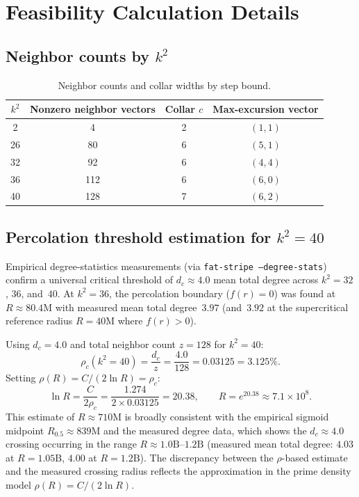 \documentclass[11pt,a4paper]{article}
\newcommand{\fr}{f(r)}
\newcommand{\Rhalf}{R_{0.5}}
\theoremstyle{definition}
\theoremstyle{plain}
\theoremstyle{remark}
\begin{document}
\section{Feasibility Calculation Details}\label{app:feasibility}

\subsection{Neighbor counts by \texorpdfstring{$k^2$}{k\texttwosuperior}}

\begin{table}[ht]
\centering
\begin{tabular}{@{}cccc@{}}
\toprule
$k^2$ & Nonzero neighbor vectors & Collar $c$ & Max-excursion vector \\
\midrule
2  & 4   & 2 & $(1, 1)$ \\
26 & 80  & 6 & $(5, 1)$ \\
32 & 92  & 6 & $(4, 4)$ \\
36 & 112 & 6 & $(6, 0)$ \\
40 & 128 & 7 & $(6, 2)$ \\
\bottomrule
\end{tabular}
\caption{Neighbor counts and collar widths by step bound.}
\label{tab:neighbor-counts}
\end{table}

\subsection{Percolation threshold estimation for \texorpdfstring{$k^2 = 40$}{k\texttwosuperior\ = 40}}

Empirical degree-statistics measurements (via \texttt{fat-stripe --degree-stats}) confirm a universal critical threshold of $d_c \approx 4.0$ mean total degree across $k^2 = 32$, $36$, and~$40$.  At $k^2 = 36$, the percolation boundary ($\fr = 0$) was found at $R \approx 80.4\text{M}$ with measured mean total degree~$3.97$ (and~$3.92$ at the supercritical reference radius $R = 40\text{M}$ where $\fr > 0$).

Using $d_c = 4.0$ and total neighbor count $z = 128$ for $k^2 = 40$:
\[
  \rho_c(k^2 = 40) = \frac{d_c}{z} = \frac{4.0}{128} = 0.03125 = 3.125\%.
\]
Setting $\rho(R) = C / (2\ln R) = \rho_c$:
\[
  \ln R = \frac{C}{2\rho_c} = \frac{1.274}{2 \times 0.03125} = 20.38, \qquad R = e^{20.38} \approx 7.1 \times 10^8.
\]
This estimate of $R \approx 710\text{M}$ is broadly consistent with the empirical sigmoid midpoint $\Rhalf \approx 839\text{M}$ and the measured degree data, which shows the $d_c \approx 4.0$ crossing occurring in the range $R \approx 1.0\text{B}$--$1.2\text{B}$ (measured mean total degree: $4.03$ at $R = 1.05\text{B}$, $4.00$ at $R = 1.2\text{B}$).  The discrepancy between the $\rho$-based estimate and the measured crossing radius reflects the approximation in the prime density model $\rho(R) = C / (2\ln R)$.
\end{document}
